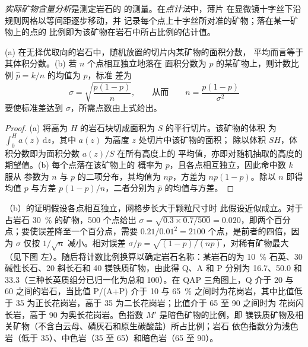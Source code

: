 \begin{definition}\label{def:b2:field-lab-methods-2:modal}
\emph{实际矿物含量分析}是测定岩石的
的测量。在\emph{点计法}中，薄片
在显微镜十字丝下沿规则网格以等间距逐步移动，并
记录每个点上十字丝所对准的矿物；落在某一矿物上的点的
比例即为该矿物在岩石中所占比例的估计值。
\end{definition}

\begin{proposition}\label{prop:b2:field-lab-methods-2:counting}
(a) 在无择优取向的岩石中，随机放置的切片内某矿物的面积分数，
平均而言等于其体积分数。(b) 若 $n$ 个点相互独立地落在
面积分数为 $p$ 的某矿物上，则计数比例 $\hat p = k/n$ 的均值为 $p$，标准
差为
\begin{equation}
\sigma = \sqrt{\frac{p(1-p)}{n}} , \qquad\text{从而}\qquad n = \frac{p(1-p)}{\sigma^2}
\label{eq:b2:field-lab-methods-2:binomial}
\end{equation}
要使标准差达到 $\sigma$，所需点数由上式给出。
\end{proposition}

\begin{proof}
(a) 将高为 $H$ 的岩石块切成面积为 $S$ 的平行切片。该矿物的体积
为 $\int_0^H a(z)\,\mathrm{d}z$，其中 $a(z)$ 为高度 $z$ 处切片中该矿物的面积；
除以体积 $SH$，体积分数即为面积分数 $a(z)/S$ 在所有高度上的
平均值，亦即对随机抽取的高度的期望值。(b) 每个点落在该矿物上的
概率为 $p$，且各点相互独立，因此命中数 $k$ 服从
参数为 $n$ 与 $p$ 的二项分布，其均值为 $np$，方差为 $np(1-p)$。除以
$n$ 即得均值 $p$ 与方差 $p(1-p)/n$，二者分别为 $\hat p$ 的均值与方差。
\end{proof}

（b）的证明假设各点相互独立，网格步长大于颗粒尺寸时
此假设近似成立。对于占岩石 \qty{30}{\percent} 的矿物，500 个点给出 $\sigma =
\sqrt{0.3 \times 0.7/500} = 0.020$，即两个百分点；要使误差降至一个百分点，需要
$0.21/0.01^2 = 2100$ 个点，是前者的四倍，因为 $\sigma$ 仅按 $1/\sqrt n$ 减小。相对误差
$\sigma/p = \sqrt{(1-p)/(np)}$，对稀有矿物最大（见下图
左）。随后将计数比例换算以确定岩石名称：某岩石的为
\qty{10}{\percent} 石英、30 碱性长石、20 斜长石和 40 镁铁质矿物，由此得 Q、A 和
P 分别为 16.7、50.0 和 33.3（三种长英质组分已归一化为总和 100）。在 QAP
三角图上，Q 介于 20 与 60 之间的岩石，当比值 P/(A+P) 介于 10 与
\qty{65}{\percent} 之间时为花岗岩，其中比值低于 35 为正长花岗岩，高于 35 为二长花岗岩；比值介于 65 至 90 之间时为
花岗闪长岩，高于 90 为奥长花岗岩。色指数 $M'$ 是暗色矿物的比例，即
镁铁质矿物及相关矿物（不含白云母、磷灰石和原生碳酸盐）所占比例；岩石
依色指数分为浅色岩（低于 35）、中色岩（35 至 65）和暗色岩（65 至 90）。

